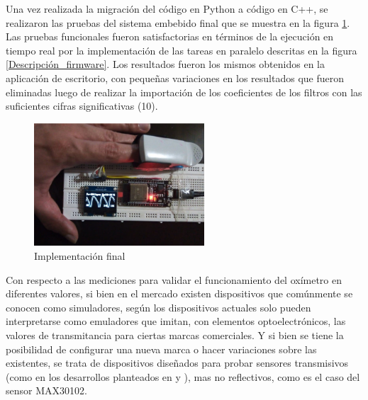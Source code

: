 \documentclass[journal]{IEEEtran}
\begin{document}
Una vez realizada la migración del código en Python a código en C++, se realizaron las pruebas del sistema embebido final que se muestra en la figura \ref{montaje_final}. Las pruebas funcionales fueron satisfactorias en términos de la ejecución en tiempo real por la implementación de las tareas en paralelo descritas en la figura \ref{Descripción_firmware}. Los resultados fueron los mismos obtenidos en la aplicación de escritorio, con pequeñas variaciones en los resultados que fueron eliminadas luego de realizar la importación de los coeficientes de los filtros con las suficientes cifras significativas (10).

\begin{figure}[!h]
	\centering
	\includegraphics[width=2.5in]{montaje_final.png}
	\caption{Implementación final}
	\label{montaje_final}
\end{figure}

Con respecto a las mediciones para validar el funcionamiento del oxímetro en diferentes valores, si bien en el mercado existen dispositivos que comúnmente se conocen como simuladores, según \cite{G_There_is_no_such_thing_as_a_SpO2_simulator} los dispositivos actuales solo pueden interpretarse como emuladores que imitan, con elementos optoelectrónicos, las valores de transmitancia para ciertas marcas comerciales. Y si bien se tiene la posibilidad de configurar una nueva marca o hacer variaciones sobre las existentes, se trata de dispositivos diseñados para probar sensores transmisivos {\color{green}(como en los desarrollos planteados en \cite{G_oximetro_ijie} y \cite{G_validacion_oximetro_texas_fluke})},  mas no reflectivos, como es el caso del sensor MAX30102.
\end{document}
